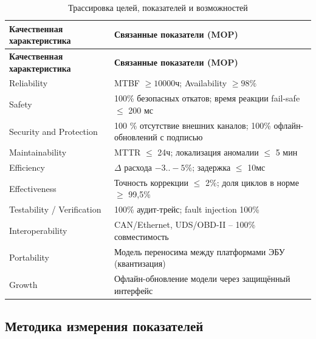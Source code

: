 \documentclass[14pt, a4paper]{extarticle}
\begin{document}
				\noindent
				\begin{xltabular}{\textwidth}{|L|L|}
					\caption{Трассировка целей, показателей и возможностей}\label{tab:t3}\\
					\hline
					\textbf{Качественная характеристика} & \textbf{Связанные показатели (MOP)} \\
					\hline
					\endfirsthead
					\hline
					\textbf{Качественная характеристика} & \textbf{Связанные показатели (MOP)} \\
					\hline
					\endhead
					\hline
					\endfoot
					\hline
					\endlastfoot
					Reliability & MTBF $\geq 10000$ч; Availability $\geq 98\%$ \\
					\hline
					Safety & 100\% безопасных откатов; время реакции fail-safe $\leq$ 200 мс \\
					\hline
					Security and Protection & 100 \% отсутствие внешних каналов; 100\% офлайн-обновлений с подписью \\
					\hline
					Maintainability & MTTR $\leq$ 24ч; локализация аномалии $\leq$ 5 мин \\
					\hline
					Efficiency & $\Delta$ расхода $-3..-5\%$; задержка $\leq$ 10мс \\
					\hline
					Effectiveness & Точность коррекции $\leq$ 2\%; доля циклов в норме $\geq$ 99,5\% \\
					\hline
					Testability / Verification & 100\% аудит-трейс; fault injection 100\% \\
					\hline
					Interoperability & CAN/Ethernet, UDS/OBD-II -- 100\% совместимость \\
					\hline
					Portability & Модель переносима между платформами ЭБУ (квантизация) \\
					\hline
					Growth & Офлайн-обновление модели через защищённый интерфейс \\
					\hline
				\end{xltabular}
				\vspace{\parindent}
			
			\subsection{Методика измерения показателей}
			
\end{document}
